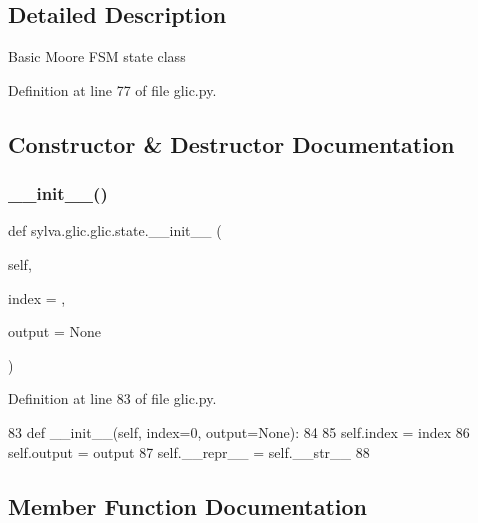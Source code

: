 \subsection{Detailed Description}
\begin{DoxyVerb}  Basic Moore FSM state class
\end{DoxyVerb}
 

Definition at line 77 of file glic.\+py.



\subsection{Constructor \& Destructor Documentation}
\mbox{\label{classsylva_1_1glic_1_1glic_1_1state_a0f4333a285db0815af061030147719bc}} 
\subsubsection{\texorpdfstring{\+\_\+\+\_\+init\+\_\+\+\_\+()}{\_\_init\_\_()}}
{\footnotesize\ttfamily def sylva.\+glic.\+glic.\+state.\+\_\+\+\_\+init\+\_\+\+\_\+ (\begin{DoxyParamCaption}\item[{}]{self,  }\item[{}]{index = {},  }\item[{}]{output = {\ttfamily None} }\end{DoxyParamCaption})}



Definition at line 83 of file glic.\+py.


\begin{DoxyCode}
83         \textcolor{keyword}{def }\_\_init\_\_(self, index=0, output=None):
84 
85             self.index = index
86             self.output = output
87             self.\_\_repr\_\_ = self.\_\_str\_\_
88 
\end{DoxyCode}


\subsection{Member Function Documentation}
\mbox{\label{classsylva_1_1glic_1_1glic_1_1state_ae76daa7ee7736520b44faadbe0cd0b39}} 
